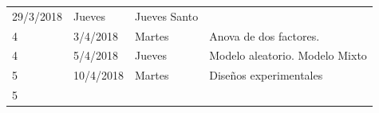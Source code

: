 \documentclass[]{book}
\theoremstyle{definition}
\theoremstyle{definition}
\theoremstyle{definition}
\theoremstyle{remark}
\begin{document}
\begin{longtable}[]{@{}llll@{}}
\begin{minipage}[t]{0.07\columnwidth}
29/3/2018\strut
\end{minipage} & \begin{minipage}[t]{0.05\columnwidth}\raggedright
Jueves\strut
\end{minipage} & \begin{minipage}[t]{0.71\columnwidth}\raggedright
Jueves Santo\strut
\end{minipage}\tabularnewline
\begin{minipage}[t]{0.05\columnwidth}\raggedright
4\strut
\end{minipage} & \begin{minipage}[t]{0.07\columnwidth}\raggedright
3/4/2018\strut
\end{minipage} & \begin{minipage}[t]{0.05\columnwidth}\raggedright
Martes\strut
\end{minipage} & \begin{minipage}[t]{0.71\columnwidth}\raggedright
Anova de dos factores.\strut
\end{minipage}\tabularnewline
\begin{minipage}[t]{0.05\columnwidth}\raggedright
4\strut
\end{minipage} & \begin{minipage}[t]{0.07\columnwidth}\raggedright
5/4/2018\strut
\end{minipage} & \begin{minipage}[t]{0.05\columnwidth}\raggedright
Jueves\strut
\end{minipage} & \begin{minipage}[t]{0.71\columnwidth}\raggedright
Modelo aleatorio. Modelo Mixto\strut
\end{minipage}\tabularnewline
\begin{minipage}[t]{0.05\columnwidth}\raggedright
5\strut
\end{minipage} & \begin{minipage}[t]{0.07\columnwidth}\raggedright
10/4/2018\strut
\end{minipage} & \begin{minipage}[t]{0.05\columnwidth}\raggedright
Martes\strut
\end{minipage} & \begin{minipage}[t]{0.71\columnwidth}\raggedright
Diseños experimentales\strut
\end{minipage}\tabularnewline
\begin{minipage}[t]{0.05\columnwidth}\raggedright
5\strut
\end{minipage} & \begin{minipage}[t]{0.07\columnwidth}\raggedright

\end{minipage}
\end{longtable}
\end{document}
